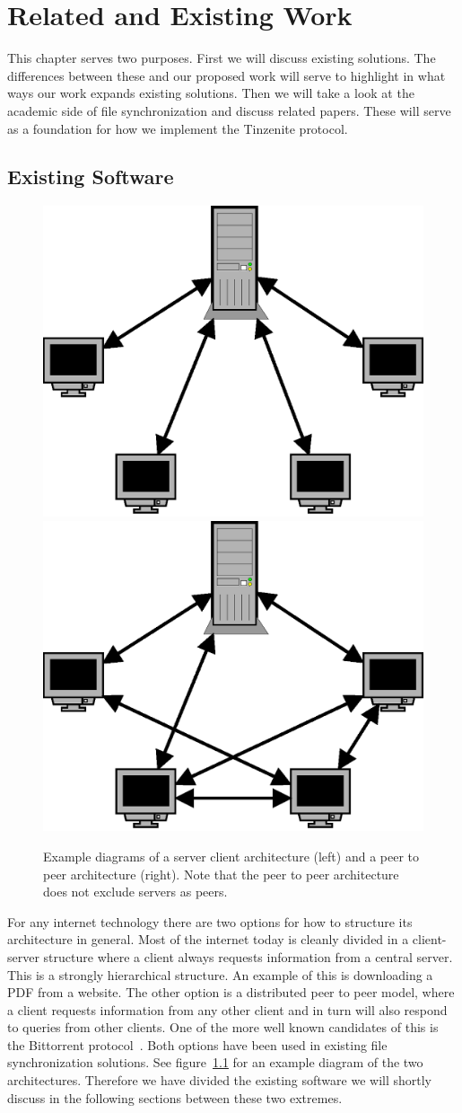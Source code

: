 \chapter{Related and Existing Work}
\label{chap:Related and Existing Work}

This chapter serves two purposes.
First we will discuss existing solutions.
The differences between these and our proposed work will serve to highlight in what ways our work expands existing solutions.
Then we will take a look at the academic side of file synchronization and discuss related papers.
These will serve as a foundation for how we implement the Tinzenite protocol.

\section{Existing Software}

\begin{figure}[htp]
\centering
    \includegraphics[width=0.3\linewidth]{diagram/topo_s2c}
    \hspace{2em}
    \includegraphics[width=0.3\linewidth]{diagram/topo_p2p}
\caption[Example Network Structures]{Example diagrams of a server client architecture (left) and a peer to peer architecture (right). Note that the peer to peer architecture does not exclude servers as peers.}
\label{fig:example_netarch}
\end{figure}

For any internet technology there are two options for how to structure its architecture in general.
Most of the internet today is cleanly divided in a client-server structure where a client always requests information from a central server.
This is a strongly hierarchical structure.
An example of this is downloading a PDF from a website.
The other option is a distributed peer to peer model, where a client requests information from any other client and in turn will also respond to queries from other clients.
One of the more well known candidates of this is the Bittorrent protocol~\cite{web:site:bittorrent}.
Both options have been used in existing file synchronization solutions.
See figure~\ref{fig:example_netarch} for an example diagram of the two architectures.
Therefore we have divided the existing software we will shortly discuss in the following sections between these two extremes.

